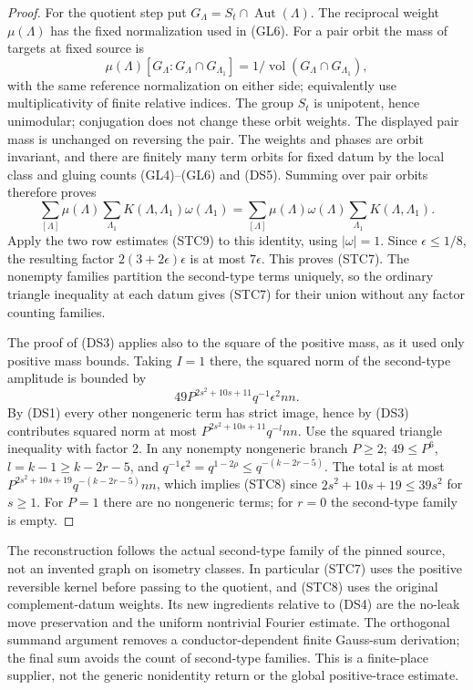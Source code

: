 \begin{proof}
For the quotient step put \(G_\Lambda=
S_t\cap\operatorname{Aut}(\Lambda)\).
The reciprocal weight \(\mu(\Lambda)\) has the
fixed normalization used in (GL6). For a pair
orbit the mass of targets at fixed source is
\[
 \mu(\Lambda)[G_\Lambda:G_\Lambda\cap G_{\Lambda_1}]
 =1/\operatorname{vol}(G_\Lambda\cap G_{\Lambda_1}),
\]
with the same reference normalization on either
side; equivalently use multiplicativity of finite
relative indices. The group \(S_t\) is unipotent, hence
unimodular; conjugation does not change these orbit weights.
The displayed pair mass is unchanged on reversing
the pair. The weights and phases are orbit invariant,
and there are finitely many term orbits for fixed
datum by the local class and gluing counts (GL4)--(GL6)
and (DS5). Summing over pair orbits therefore proves
\[
 \sum_{[\Lambda]}\mu(\Lambda)\sum_{\Lambda_1}
 K(\Lambda,\Lambda_1)\omega(\Lambda_1)
 =
 \sum_{[\Lambda]}\mu(\Lambda)\omega(\Lambda)
                        \sum_{\Lambda_1}K(\Lambda,\Lambda_1).
\]
Apply the two row estimates (STC9) to this identity,
using \(|\omega|=1\). Since \(\epsilon\le1/8\), the
resulting factor \(2(3+2\epsilon)\epsilon\) is
at most \(7\epsilon\). This proves (STC7).
The nonempty families partition the second-type
terms uniquely, so the ordinary triangle inequality
at each datum gives (STC7) for their union without
any factor counting families.

The proof of (DS3) applies also to the square of
the positive mass, as it used only positive mass
bounds. Taking \(I=1\) there, the squared norm of
the second-type amplitude is bounded by
\[
 49 P^{2s^2+10s+11}q^{-1}\epsilon^2 nn .
\]
By (DS1) every other nongeneric term has strict
image, hence by (DS3) contributes squared norm at
most \(P^{2s^2+10s+11}q^{-l}nn\).
Use the squared triangle inequality with factor 2.
In any nonempty nongeneric branch \(P\ge2\);
\(49\le P^6\), \(l=k-1\ge k-2r-5\), and
\(q^{-1}\epsilon^2=q^{1-2\rho}\le
q^{-(k-2r-5)}\). The total is at most
\(P^{2s^2+10s+19}q^{-(k-2r-5)}nn\),
which implies (STC8) since
\(2s^2+10s+19\le39s^2\) for \(s\ge1\).
For \(P=1\) there are no nongeneric terms; for
\(r=0\) the second-type family is empty.
\end{proof}

The reconstruction follows the actual second-type family
of the pinned source, not an invented graph on isometry
classes. In particular (STC7) uses the positive reversible
kernel before passing to the quotient, and (STC8) uses the
original complement-datum weights. Its new ingredients
relative to (DS4) are the no-leak move preservation and
the uniform nontrivial Fourier estimate. The orthogonal
summand argument removes a conductor-dependent finite
Gauss-sum derivation; the final sum avoids the count of
second-type families. This is a finite-place supplier,
not the generic nonidentity return or the global
positive-trace estimate.
